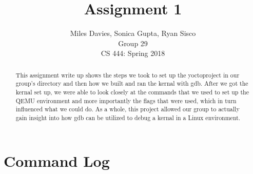 \documentclass[10pt, onecolumn, letterpaper, draftclsnofoot]{IEEEtran}
\title{Assignment 1}
\author{Miles Davies, Sonica Gupta, Ryan Sisco \\ Group 29 \\ CS 444: Spring 2018}
\begin{document}
\maketitle
\begin{abstract}
\noindent This assignment write up shows the steps we took to set up the yoctoproject in
our group's directory and then how we built and ran the kernal with gdb. After
we got the kernal set up, we were able to look closely at the commands that we 
used to set up the QEMU environment and more importantly the flags that were 
used, which in turn influenced what we could do. As a whole, this project allowed 
our group to actually gain insight into how gdb can be utilized to debug a kernal 
in a Linux environment.
\end{abstract}

\newpage

\tableofcontents
\newpage 

\section{Command Log}


\end{document}
